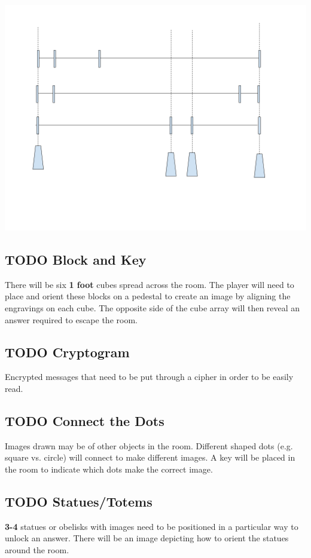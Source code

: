 \documentclass[11pt]{article}
\begin{document}
\begin{center}
\includegraphics[width=.9\linewidth]{./img/pt-rc-001.png}
\end{center}

\subsection{{\bfseries\sffamily TODO} Block and Key}
\label{sec:org6ee593a}
There will be six \textbf{1 foot} cubes spread across the room. The player will need to place and orient these blocks on a pedestal to create an image by aligning the engravings on each cube. The opposite side of the cube array will then reveal an answer required to escape the room.

\subsection{{\bfseries\sffamily TODO} Cryptogram}
\label{sec:orgd5eec0e}
Encrypted messages that need to be put through a cipher in order to be easily read.

\subsection{{\bfseries\sffamily TODO} Connect the Dots}
\label{sec:org9ad1b01}
Images drawn may be of other objects in the room. Different shaped dots (e.g. square vs. circle) will connect to make different images. A key will be placed in the room to indicate which dots make the correct image.

\subsection{{\bfseries\sffamily TODO} Statues/Totems}
\label{sec:org02e0e7b}
\textbf{3-4} statues or obelisks with images need to be positioned in a particular way to unlock an answer. There will be an image depicting how to orient the statues around the room.
\end{document}
